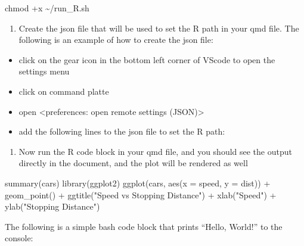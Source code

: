 \documentclass[
  letterpaper,
  DIV=11,
  numbers=noendperiod]{scrartcl}
\newenvironment{Shaded}{\begin{snugshade}}{\end{snugshade}}
\newcommand{\AttributeTok}[1]{\textcolor[rgb]{0.40,0.45,0.13}{#1}}
\newcommand{\FunctionTok}[1]{\textcolor[rgb]{0.28,0.35,0.67}{#1}}
\newcommand{\NormalTok}[1]{\textcolor[rgb]{0.00,0.23,0.31}{#1}}
\newcommand{\SpecialCharTok}[1]{\textcolor[rgb]{0.37,0.37,0.37}{#1}}
\newcommand{\StringTok}[1]{\textcolor[rgb]{0.13,0.47,0.30}{#1}}
\providecommand{\tightlist}{%
  \setlength{\itemsep}{0pt}\setlength{\parskip}{0pt}}
\begin{document}
\begin{Shaded}
\begin{Highlighting}[]
\FunctionTok{chmod}\NormalTok{ +x \textasciitilde{}/run\_R.sh}
\end{Highlighting}
\end{Shaded}

\begin{enumerate}
\def\labelenumi{\arabic{enumi}.}
\setcounter{enumi}{2}
\tightlist
\item
  Create the json file that will be used to set the R path in your qmd
  file. The following is an example of how to create the json file:
\end{enumerate}

\begin{itemize}
\tightlist
\item
  click on the gear icon in the bottom left corner of VScode to open the
  settings menu
\item
  click on command platte
\item
  open \textless preferences: open remote settings (JSON)\textgreater{}
\item
  add the following lines to the json file to set the R path:
\end{itemize}

\begin{enumerate}
\def\labelenumi{\arabic{enumi}.}
\setcounter{enumi}{3}
\tightlist
\item
  Now run the R code block in your qmd file, and you should see the
  output directly in the document, and the plot will be rendered as well
\end{enumerate}

\begin{Shaded}
\begin{Highlighting}[]
\FunctionTok{summary}\NormalTok{(cars)}
\FunctionTok{library}\NormalTok{(ggplot2)}
\FunctionTok{ggplot}\NormalTok{(cars, }\FunctionTok{aes}\NormalTok{(}\AttributeTok{x =}\NormalTok{ speed, }\AttributeTok{y =}\NormalTok{ dist)) }\SpecialCharTok{+}
  \FunctionTok{geom\_point}\NormalTok{() }\SpecialCharTok{+}
  \FunctionTok{ggtitle}\NormalTok{(}\StringTok{"Speed vs Stopping Distance"}\NormalTok{) }\SpecialCharTok{+}
  \FunctionTok{xlab}\NormalTok{(}\StringTok{"Speed"}\NormalTok{) }\SpecialCharTok{+}
  \FunctionTok{ylab}\NormalTok{(}\StringTok{"Stopping Distance"}\NormalTok{)  }
\end{Highlighting}
\end{Shaded}

The following is a simple bash code block that prints ``Hello, World!''
to the console:
\end{document}
